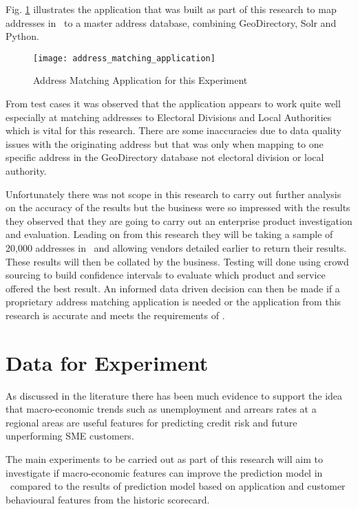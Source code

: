 Fig. \ref{fig:address_matching_application} illustrates the application that was built as part of this research to map addresses in \subjectname\ to a master address database, combining GeoDirectory, Solr and Python.

\begin{figure}[H]
	\texttt{[image: address\_matching\_application]}
	\caption{Address Matching Application for this Experiment}
	\label{fig:address_matching_application}
\end{figure}

From test cases it was observed that the application appears to work quite well especially at matching addresses to Electoral Divisions and Local Authorities which is vital for this research. There are some inaccuracies due to data quality issues with the originating address but that was only when mapping to one specific address in the GeoDirectory database not electoral division or local authority.

Unfortunately there was not scope in this research to carry out further analysis on the accuracy of the results but the business were so impressed with the results they observed that they are going to carry out an enterprise product investigation and evaluation. Leading on from this research they will be taking a sample of 20,000 addresses in \subjectname\ and allowing vendors detailed earlier to return their results. These results will then be collated by the business. Testing will done using crowd sourcing to build confidence intervals to evaluate which product and service offered the best result. An informed data driven decision can then be made if a proprietary address matching application is needed or the application from this research is accurate and meets the requirements of \subjectname.  


\section{Data for Experiment}\label{sec:dataForExper}
As discussed in the literature there has been much evidence to support the idea that macro-economic trends such as unemployment and arrears rates at a regional areas are useful features for predicting credit risk and future unperforming SME customers.

The main experiments to be carried out as part of this research will aim to investigate if macro-economic features can improve the prediction model in \subjectname\ compared to the results of prediction model based on application and customer behavioural features from the historic scorecard. 

